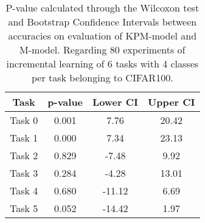 \begin{table}[H]
\centering
\begin{tabular}{cccc}
\toprule
Task & p-value & Lower CI & Upper CI \\
\midrule
Task 0 & 0.001 &7.76 & 20.42 \\
Task 1 & 0.000 &7.34 & 23.13 \\
Task 2 & 0.829 &-7.48 & 9.92 \\
Task 3 & 0.284 &-4.28 & 13.01 \\
Task 4 & 0.680 &-11.12 & 6.69 \\
Task 5 & 0.052 &-14.42 & 1.97 \\
\bottomrule
\end{tabular}
\caption{P-value calculated through the Wilcoxon test and Bootstrap Confidence Intervals between accuracies on evaluation of KPM-model and M-model. Regarding 80 experiments of incremental learning of 6 tasks with 4 classes per task belonging to CIFAR100.}
\end{table}
